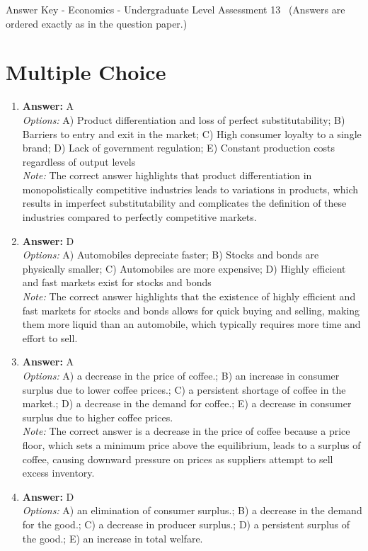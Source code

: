\documentclass[12pt]{article}
\begin{document}
\begin{center}
Answer Key - Economics - Undergraduate Level Assessment 13 \
\small (Answers are ordered exactly as in the question paper.)
\end{center}

\section*{Multiple Choice}
\begin{enumerate}[label=\arabic*.]
\item \textbf{Answer:} A
\\ \textit{Options:} A) Product differentiation and loss of perfect substitutability; B) Barriers to entry and exit in the market; C) High consumer loyalty to a single brand; D) Lack of government regulation; E) Constant production costs regardless of output levels
\\ \textit{Note:} The correct answer highlights that product differentiation in monopolistically competitive industries leads to variations in products, which results in imperfect substitutability and complicates the definition of these industries compared to perfectly competitive markets.
\item \textbf{Answer:} D
\\ \textit{Options:} A) Automobiles depreciate faster; B) Stocks and bonds are physically smaller; C) Automobiles are more expensive; D) Highly efficient and fast markets exist for stocks and bonds
\\ \textit{Note:} The correct answer highlights that the existence of highly efficient and fast markets for stocks and bonds allows for quick buying and selling, making them more liquid than an automobile, which typically requires more time and effort to sell.
\item \textbf{Answer:} A
\\ \textit{Options:} A) a decrease in the price of coffee.; B) an increase in consumer surplus due to lower coffee prices.; C) a persistent shortage of coffee in the market.; D) a decrease in the demand for coffee.; E) a decrease in consumer surplus due to higher coffee prices.
\\ \textit{Note:} The correct answer is a decrease in the price of coffee because a price floor, which sets a minimum price above the equilibrium, leads to a surplus of coffee, causing downward pressure on prices as suppliers attempt to sell excess inventory.
\item \textbf{Answer:} D
\\ \textit{Options:} A) an elimination of consumer surplus.; B) a decrease in the demand for the good.; C) a decrease in producer surplus.; D) a persistent surplus of the good.; E) an increase in total welfare.

\end{enumerate}
\end{document}
